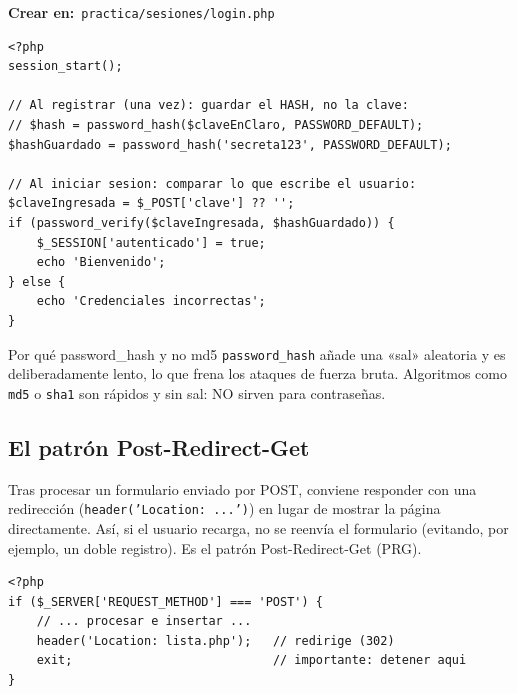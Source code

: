 \documentclass[11pt]{article}
\begin{document}
{\small\color{phpazulo}\textbf{Crear en:}~}\texttt{practica/\allowbreak{}sesiones/\allowbreak{}login.\allowbreak{}php}\par\nobreak\vspace{-1pt}
\begin{cajacodigo}
\begin{lstlisting}[style=php]
<?php
session_start();

// Al registrar (una vez): guardar el HASH, no la clave:
// $hash = password_hash($claveEnClaro, PASSWORD_DEFAULT);
$hashGuardado = password_hash('secreta123', PASSWORD_DEFAULT);

// Al iniciar sesion: comparar lo que escribe el usuario:
$claveIngresada = $_POST['clave'] ?? '';
if (password_verify($claveIngresada, $hashGuardado)) {
    $_SESSION['autenticado'] = true;
    echo 'Bienvenido';
} else {
    echo 'Credenciales incorrectas';
}
\end{lstlisting}
\end{cajacodigo}
\vspace{2pt}
\begin{cajawarn}{Por qué password\_hash y no md5}
\texttt{password\_hash} añade una «sal» aleatoria y es deliberadamente lento, lo que frena los ataques de fuerza bruta. Algoritmos como \texttt{md5} o \texttt{sha1} son rápidos y sin sal: NO sirven para contraseñas.\par
\end{cajawarn}
\subsection{El patrón Post-Redirect-Get}
Tras procesar un formulario enviado por POST, conviene responder con una redirección (\texttt{header('Location:\allowbreak{} .\allowbreak{}.\allowbreak{}.\allowbreak{}')}) en lugar de mostrar la página directamente. Así, si el usuario recarga, no se reenvía el formulario (evitando, por ejemplo, un doble registro). Es el patrón Post-Redirect-Get (PRG).

\begin{cajacodigo}
\begin{lstlisting}[style=php]
<?php
if ($_SERVER['REQUEST_METHOD'] === 'POST') {
    // ... procesar e insertar ...
    header('Location: lista.php');   // redirige (302)
    exit;                            // importante: detener aqui
}
\end{lstlisting}
\end{cajacodigo}
\vspace{2pt}
\end{document}

